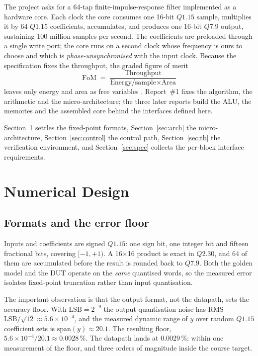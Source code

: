 \documentclass[conference]{IEEEtran}
\newcommand{\qf}[2]{Q#1.#2}
\begin{document}
The project asks for a 64-tap finite-impulse-response filter implemented as a
hardware core. Each clock the core consumes one 16-bit $\qf{1}{15}$ sample,
multiplies it by 64 $\qf{1}{15}$ coefficients, accumulates, and produces one
16-bit $\qf{7}{9}$ output, sustaining 100 million samples per second. The
coefficients are preloaded through a single write port; the core runs on a
second clock whose frequency is ours to choose and which is
\emph{phase-unsynchronised} with the input clock. Because the specification
fixes the throughput, the graded figure of merit
\begin{equation}
  \mathrm{FoM} \;=\; \frac{\text{Throughput}}{\text{Energy/sample} \times \text{Area}}
\end{equation}
leaves only energy and area as free variables
\cite{lec}. Report~\#1 fixes the algorithm, the arithmetic and the
micro-architecture; the three later reports build the ALU, the memories and
the assembled core behind the interfaces defined here.

Section~\ref{sec:num} settles the fixed-point formats, Section~\ref{sec:arch}
the micro-architecture, Section~\ref{sec:control} the control path,
Section~\ref{sec:tb} the verification environment, and
Section~\ref{sec:spec} collects the per-block interface requirements.

\section{Numerical Design}\label{sec:num}

\subsection{Formats and the error floor}

Inputs and coefficients are signed $\qf{1}{15}$: one sign bit, one integer bit
and fifteen fractional bits, covering $[-1,+1)$. A 16$\times$16 product is
exact in $\qf{2}{30}$, and 64 of them are accumulated before the result is
rounded back to $\qf{7}{9}$. Both the golden model and the DUT operate on the
\emph{same} quantised words, so the measured error isolates fixed-point
truncation rather than input quantisation.

The important observation is that the output format, not the datapath, sets
the accuracy floor. With $\mathrm{LSB} = 2^{-9}$ the output quantisation noise
has RMS $\mathrm{LSB}/\sqrt{12} \approx 5.6\times10^{-4}$, and the measured
dynamic range of $y$ over random $\qf{1}{15}$ coefficient sets is
$\mathrm{span}(y)\approx 20.1$. The resulting floor,
$5.6\times10^{-4}/20.1 \approx 0.0028\,\%$. The datapath lands at
$0.0029\,\%$: within one measurement of the floor, and three orders of
magnitude inside the course target.
\end{document}
